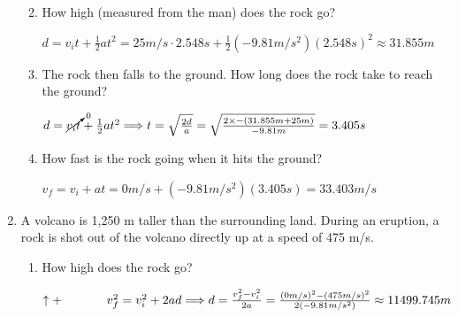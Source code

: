 \documentclass[letterpaper, 12pt]{article}
\begin{document}
\begin{enumerate}
\begin{enumerate}
			\vspace{-.1in} 
		\item How high (measured from the man) does the rock go?

							
			\color{red}
			\begin{center}
				\hspace{-1in} $ d = v_i t + \frac{1}{2}at^2 = 25 m/s \cdot 2.548s+ \frac{1}{2}(-9.81m/s^2)(2.548s)^2 \approx 31.855 m
				$
			\end{center}
			\color{black}

		\item The rock then falls to the ground.  How long does the rock take to reach the ground?
										
			\color{red}
			\begin{center}
				\hspace{-1in} $  d = \cancelto{0}{v_it} + \frac{1}{2}at^2 \Longrightarrow t = \sqrt{\frac{2d}{a}} = \sqrt{\frac{2\times -(31.855m+25m)}{-9.81m}} = 3.405s
				$
			\end{center}
			\color{black}
			


		\item How fast is the rock going when it hits the ground?
	
												
			\color{red}
			\begin{center}
				\hspace{-1in} $  v_f = v_i + at = 0 m/s + (-9.81 m/s^2)(3.405s) = 33.403m/s
				$
			\end{center}
			\color{black}
	
	
	\end{enumerate}

	\item A volcano is 1,250 m taller than the surrounding land.  During an eruption, a rock is shot out of the volcano directly up at a speed of 475 m/s.  
	\begin{enumerate}
		\item How high does the rock go?

		\color{red}
		\begin{center}
			\vspace{0.15in}
			 $ \uparrow+ \hspace{0.5in} v_f^2 = v_i^2 + 2ad \Longrightarrow d = \frac{v_f^2-v_i^2}{2a} = \frac{(0m/s)^2-(475m/s)^2}{2(-9.81m/s^2)} \approx 11499.745 m
			$
		\end{center}
		\color{black}
			\vspace{0.15in}		
		



\end{enumerate}
\end{enumerate}
\end{document}
